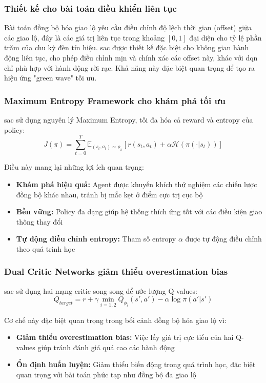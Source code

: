\subsubsection{Thiết kế cho bài toán điều khiển liên tục}
Bài toán đồng bộ hóa giao lộ yêu cầu điều chỉnh độ lệch thời gian (offset) giữa các giao lộ, đây là các giá trị liên tục trong khoảng $[0, 1]$ đại diện cho tỷ lệ phần trăm của chu kỳ đèn tín hiệu. \ac{sac} được thiết kế đặc biệt cho không gian hành động liên tục, cho phép điều chỉnh mịn và chính xác các offset này, khác với \ac{dqn} chỉ phù hợp với hành động rời rạc. Khả năng này đặc biệt quan trọng để tạo ra hiệu ứng "green wave" tối ưu.

\subsubsection{Maximum Entropy Framework cho khám phá tối ưu}
\ac{sac} sử dụng nguyên lý Maximum Entropy, tối đa hóa cả reward và entropy của policy:
\begin{equation}
    J(\pi) = \sum_{t=0}^{T} \mathbb{E}_{(s_t,a_t) \sim \rho_\pi} [r(s_t, a_t) + \alpha \mathcal{H}(\pi(\cdot|s_t))]
\end{equation}

Điều này mang lại những lợi ích quan trọng:
\begin{itemize}
    \item \textbf{Khám phá hiệu quả:} Agent được khuyến khích thử nghiệm các chiến lược đồng bộ khác nhau, tránh bị mắc kẹt ở điểm cực trị cục bộ
    \item \textbf{Bền vững:} Policy đa dạng giúp hệ thống thích ứng tốt với các điều kiện giao thông thay đổi
    \item \textbf{Tự động điều chỉnh entropy:} Tham số entropy $\alpha$ được tự động điều chỉnh theo quá trình học
\end{itemize}

\subsubsection{Dual Critic Networks giảm thiểu overestimation bias}
\ac{sac} sử dụng hai mạng critic song song để ước lượng Q-values:
\begin{equation}
    Q_{target} = r + \gamma \min_{i=1,2} Q_{\phi_i}(s', a') - \alpha \log \pi(a'|s')
\end{equation}

Cơ chế này đặc biệt quan trọng trong bối cảnh đồng bộ hóa giao lộ vì:
\begin{itemize}
    \item \textbf{Giảm thiểu overestimation bias:} Việc lấy giá trị cực tiểu của hai Q-values giúp tránh đánh giá quá cao các hành động
    \item \textbf{Ổn định huấn luyện:} Giảm thiểu biến động trong quá trình học, đặc biệt quan trọng với bài toán phức tạp như đồng bộ đa giao lộ
\end{itemize}

